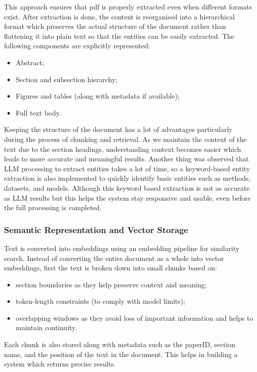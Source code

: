 \documentclass[10pt]{article}
\begin{document}
This approach ensures that pdf is properly extracted even when different formats exist. After extraction is done, the content is reorganised into a hierarchical format which preserves the actual structure of the document rather than flattening it into plain text so that the entities can be easily extracted. The following components are explicitly represented:
\begin{itemize}[leftmargin=*,noitemsep]
\item Abstract;
\item Section and subsection hierarchy;
\item Figures and tables (along with metadata if available);
\item Full text body.
\end{itemize}

Keeping the structure of the document has a lot of advantages particularly during the process of chunking and retrieval. As we maintain the context of the text due to the section headings, understanding context becomes easier which leads to more accurate and meaningful results. Another thing was observed that LLM processing to extract entities takes a lot of time, so a keyword-based entity extraction is also implemented to quickly identify basic entities such as methods, datasets, and models. Although this keyword based extraction is not as accurate as LLM results but this helps the system stay responsive and usable, even before the full processing is completed.

\subsubsection{Semantic Representation and Vector Storage}
Text is converted into embeddings using an embedding pipeline for similarity search. Instead of converting the entire document as a whole into vector embeddings, first the text is broken down into small chunks based on:
\begin{itemize}[leftmargin=*,noitemsep]
\item section boundaries as they help preserve context and meaning;
\item token-length constraints (to comply with model limits);
\item overlapping windows as they avoid loss of important information and helps to maintain continuity.
\end{itemize}

Each chunk is also stored along with metadata such as the paperID, section name, and the position of the text in the document. This helps in building a system which returns precise results.
\end{document}

